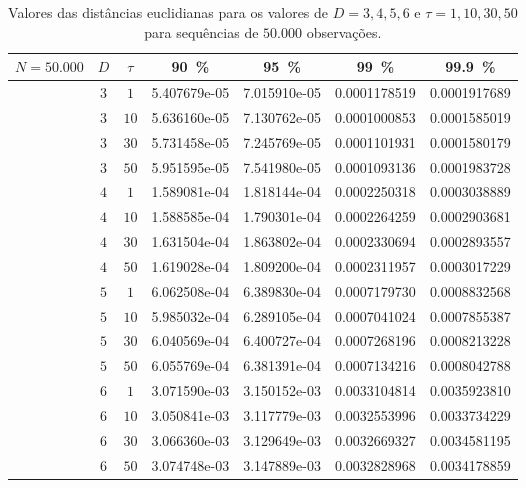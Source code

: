 \begin{table}[hbt]
	\centering
	\caption{Valores das distâncias euclidianas para os valores de $D= 3, 4, 5, 6$ e $\tau=1, 10, 30, 50$ para sequências de $50.000$ observações.}\label{tab:dEuclid_50k}
	\begin{tabular}{ccccccc}
		\toprule
$N = 50.000$	&  $D$  &$\tau$  &\SI{90}{\percent}&\SI{95}{\percent}&\SI{99}{\percent}&\SI{99.9}{\percent}\\ 
\midrule
				&  $3$  &  $ 1$  &  5.407679e-05  &  7.015910e-05  &  0.0001178519  &  0.0001917689 \\ 
				&  $3$  &  $10$  &  5.636160e-05  &  7.130762e-05  &  0.0001000853  &  0.0001585019 \\
				&  $3$  &  $30$  &  5.731458e-05  &  7.245769e-05  &  0.0001101931  &  0.0001580179 \\
				&  $3$  &  $50$  &  5.951595e-05  &  7.541980e-05  &  0.0001093136  &  0.0001983728 \\ 
\midrule
				&  $4$  &  $ 1$  &  1.589081e-04  &  1.818144e-04  &  0.0002250318  &  0.0003038889 \\ 
				&  $4$  &  $10$  &  1.588585e-04  &  1.790301e-04  &  0.0002264259  &  0.0002903681 \\
				&  $4$  &  $30$  &  1.631504e-04  &  1.863802e-04  &  0.0002330694  &  0.0002893557 \\
				&  $4$  &  $50$  &  1.619028e-04  &  1.809200e-04  &  0.0002311957  &  0.0003017229 \\ 
\midrule
				&  $5$  &  $ 1$  &  6.062508e-04  &  6.389830e-04  &  0.0007179730  &  0.0008832568 \\ 
				&  $5$  &  $10$  &  5.985032e-04  &  6.289105e-04  &  0.0007041024  &  0.0007855387 \\
				&  $5$  &  $30$  &  6.040569e-04  &  6.400727e-04  &  0.0007268196  &  0.0008213228 \\
				&  $5$  &  $50$  &  6.055769e-04  &  6.381391e-04  &  0.0007134216  &  0.0008042788 \\ 
\midrule
				&  $6$  &  $ 1$  &  3.071590e-03  &  3.150152e-03  &  0.0033104814  &  0.0035923810 \\ 
				&  $6$  &  $10$  &  3.050841e-03  &  3.117779e-03  &  0.0032553996  &  0.0033734229 \\
				&  $6$  &  $30$  &  3.066360e-03  &  3.129649e-03  &  0.0032669327  &  0.0034581195 \\
				&  $6$  &  $50$  &  3.074748e-03  &  3.147889e-03  &  0.0032828968  &  0.0034178859 \\
		\bottomrule
	\end{tabular}
\end{table}